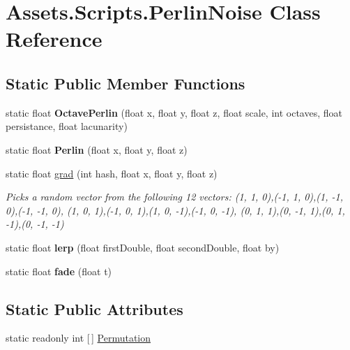 \hypertarget{class_assets_1_1_scripts_1_1_perlin_noise}{}\section{Assets.\+Scripts.\+Perlin\+Noise Class Reference}
\label{class_assets_1_1_scripts_1_1_perlin_noise}
\subsection*{Static Public Member Functions}
\begin{DoxyCompactItemize}
\item 
\mbox{\label{class_assets_1_1_scripts_1_1_perlin_noise_abb0f38b2065f2bf92baa8e33b364fad3}} 
static float {\bfseries Octave\+Perlin} (float x, float y, float z, float scale, int octaves, float persistance, float lacunarity)
\item 
\mbox{\label{class_assets_1_1_scripts_1_1_perlin_noise_a126a47fd87c2c24d18a906ac6c60c1a4}} 
static float {\bfseries Perlin} (float x, float y, float z)
\item 
static float \mbox{\hyperlink{class_assets_1_1_scripts_1_1_perlin_noise_acf602f5adb436883f20184ec6020e8b7}{grad}} (int hash, float x, float y, float z)
\begin{DoxyCompactList}\small\item\em Picks a random vector from the following 12 vectors\+: (1, 1, 0),(-\/1, 1, 0),(1, -\/1, 0),(-\/1, -\/1, 0), (1, 0, 1),(-\/1, 0, 1),(1, 0, -\/1),(-\/1, 0, -\/1), (0, 1, 1),(0, -\/1, 1),(0, 1, -\/1),(0, -\/1, -\/1) \end{DoxyCompactList}\item 
\mbox{\label{class_assets_1_1_scripts_1_1_perlin_noise_a0a9585c89676dbed37137fc71b11fec7}} 
static float {\bfseries lerp} (float first\+Double, float second\+Double, float by)
\item 
\mbox{\label{class_assets_1_1_scripts_1_1_perlin_noise_a6814246a684b081178e01c960a4edd96}} 
static float {\bfseries fade} (float t)
\end{DoxyCompactItemize}
\subsection*{Static Public Attributes}
\begin{DoxyCompactItemize}
\item 
static readonly int \mbox{[}$\,$\mbox{]} \mbox{\hyperlink{class_assets_1_1_scripts_1_1_perlin_noise_a46a02100e36b5623fe5ec906851293b6}{Permutation}}
\end{DoxyCompactItemize}
